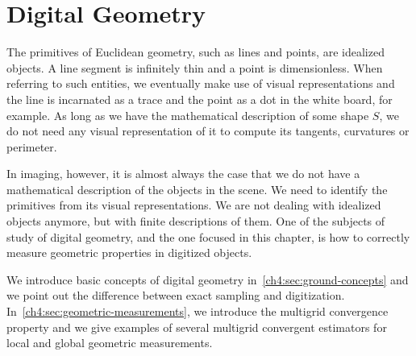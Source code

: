 \chapter{Digital Geometry}
\label{chapter:digital-geometry}

The primitives of Euclidean geometry, such as lines and points, are idealized objects. A line segment is infinitely thin and a point is dimensionless. When referring to such entities, we eventually make use of visual representations and the line is incarnated as a trace and the point as a dot in the white board, for example. As long as we have the mathematical description of some shape $S$, we do not need any visual representation of it to compute its tangents, curvatures or perimeter. 

In imaging, however, it is almost always the case that we do not have a mathematical description of the objects in the scene. We need to identify the primitives from its visual representations.  We are not dealing with idealized objects anymore, but with finite descriptions of them. One of the subjects of study of digital geometry, and the one focused in this chapter, is how to correctly measure geometric properties in digitized objects.

We introduce basic concepts of digital geometry in~\cref{ch4:sec:ground-concepts} and we point out the difference between exact sampling and digitization. In~\cref{ch4:sec:geometric-measurements}, we introduce the multigrid convergence property and we give examples of several multigrid convergent estimators for local and global geometric measurements.

%


